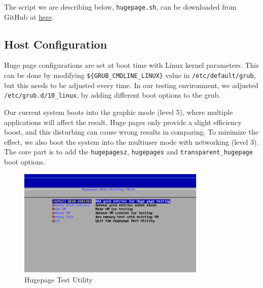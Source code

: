 \documentclass[12pt]{article}
\begin{document}
The script we are describing below, \texttt{hugepage.sh}, can be downloaded from GitHub at \textcolor{blue}{\href{https://gist.github.com/Victrid/bcd412e0f7e421ec6b4b2fffc3da4923}{here}}.

\subsection{Host Configuration}

Huge page configurations are set at boot time with Linux kernel parameters. This can be done by modifying \texttt{\$\{GRUB\_CMDLINE\_LINUX\}} value in \texttt{/etc/default/grub}, but this needs to be adjusted every time. In our testing environment, we adjusted \texttt{/etc/grub.d/10\_linux}, by adding different boot options to the grub.

Our current system boots into the graphic mode (level 5), where multiple applications will affect the result. Huge pages only provide a slight efficiency boost, and this disturbing can cause wrong results in comparing. To minimize the effect, we also boot the system into the multiuser mode with networking (level 3). The core part is to add the \texttt{hugepagesz}, \texttt{hugepages} and \texttt{transparent\_hugepage} boot options.




\begin{figure}[h]
	\centering
	\includegraphics[width=0.8\textwidth]{fig1.png}
	\caption{Hugepage Test Utility}
	\label{fig:hpt}
\end{figure}
\end{document}
